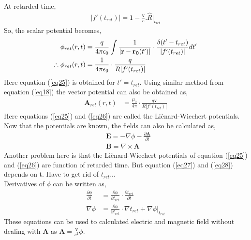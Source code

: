 \documentclass[11pt,a4paper]{article}
\begin{document}
At retarded time,
\begin{align}
    |f'(t_{ret})| = 1-\frac{\mathbf{v}}{c}.\hat{R}|_{t_{ret}} \label{eq24}
\end{align}
So, the scalar potential becomes,
\begin{align}
    \phi_{ret}(r,t) &= \frac{q}{4\pi \epsilon_0} \int \frac{1}{|\mathbf{r} - \mathbf{r_0}(t')|}\cdot \frac{\delta(t'-t_{ret})}{|f'(t_{ret})|} dt' \notag \\
    \therefore \phi_{ret}(r,t) &= \frac{1}{4\pi \epsilon_0}\cdot \frac{q}{R|f'(t_{ret})|} \label{eq25}
\end{align}
Here equation (\ref{eq25}) is obtained for $t' = t_{ret}$. Using similar method from equation (\ref{eq18}) the vector potential can also be obtained as,
\begin{align}
    \mathbf{A}_{ret}(r,t) &= \frac{\mu_0}{4\pi }\cdot \frac{q\mathbf{v}}{R|f'(t_{ret})|} \label{eq26}
\end{align}
Here equations (\ref{eq25}) and (\ref{eq26}) are called the Li\`enard-Wiechert potentials. 
Now that the potentials are known, the fields can also be calculated as,
\begin{align}                                                                                                                    
     & \mathbf{E} = -\nabla \phi - \frac{\partial \mathbf{A}}{\partial t}\label{eq27} \\                                                       
     & \mathbf{B} = \nabla \times \mathbf{A}\label{eq28}                                                                                       
\end{align} 
Another problem here is that the Li\`enard-Wiechert potentials of equation (\ref{eq25}) and (\ref{eq26}) are function of retarded time. 
But equation (\ref{eq27}) and (\ref{eq28}) depends on t. Have to get rid of $t_{ret}$...\\
Derivatives of $\phi$ can be written as,
\begin{align}
    \frac{\partial \phi}{\partial t} &= \frac{\partial \phi}{\partial t_{ret}} \cdot \frac{\partial t_{ret}}{\partial t}\label{eq29} \\
    \nabla \phi &= \frac{\partial \phi}{\partial t_{ret}}\cdot \nabla t_{ret} + \nabla \phi|_{t_{ret}} \label{eq30}  
\end{align}
These equations can be used to calculated electric and magnetic field without dealing with $\mathbf{A}$ as $\mathbf{A} = \frac{\mathbf{v}}{c^2}\phi$. \\
\end{document}
